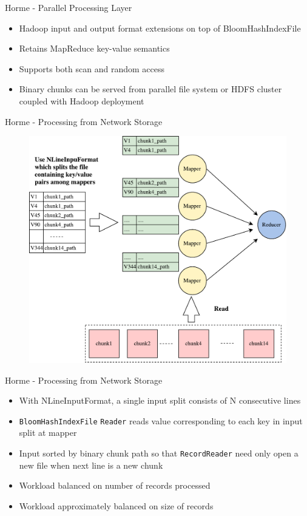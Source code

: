 \documentclass[newPxFont]{beamer}
\begin{document}
\begin{frame}[c]{Horme - Parallel Processing Layer}
  \begin{itemize}
    \item Hadoop input and output format extensions on top of BloomHashIndexFile
    \item Retains MapReduce key-value semantics 
    \item Supports both scan and random access 
    \item Binary chunks can be served from parallel file system or HDFS cluster coupled with Hadoop deployment
  \end{itemize}
\end{frame}

\begin{frame}[c]{Horme - Processing from Network Storage}
\begin{figure}[t]
  \includegraphics[scale=0.4]{horme-with-pfs}
  \centering
\end{figure}
\end{frame}

\begin{frame}[c]{Horme - Processing from Network Storage}
\begin{itemize}
  \item With NLineInputFormat, a single input split consists of N consecutive lines
  \item \texttt{BloomHashIndexFile} \texttt{Reader} reads value corresponding to each key in input split at mapper
  \item Input sorted by binary chunk path so that \texttt{RecordReader} need only open a new file when next line is a new chunk
  \item Workload balanced on number of records processed
  \item Workload approximately balanced on size of records 
\end{itemize}
\end{frame}
\end{document}
